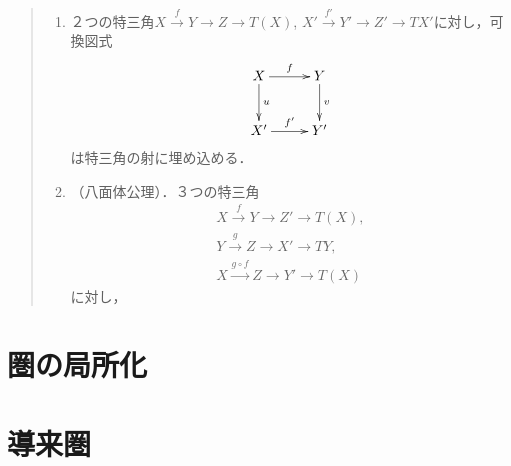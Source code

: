 \begin{Definition}
\begin{description}
\begin{quote}
\begin{enumerate}
                    特三角であることと$Y\overset{g}{\longrightarrow}
                    Z\overset{h}{\longrightarrow} T(X)\overset{-T(f)}{\longrightarrow} TY$が
                    特三角であることは同値である．\label{TR3}
                \item ２つの特三角$X\overset{f}{\to}
                Y\to Z\to T(X)$, $X'\overset{f'}{\to}
                Y'\to Z'\to TX'$に対し，可換図式
                \begin{equation*}
                    \vcenter{\xymatrix
                    @C=26pt@R=26pt
                    {
                    X\ar[r]^-{f}\ar[d]^-{u}
                    &
                    Y\ar[d]^-{v} 
                    \\
                    X'\ar[r]^-{f'}
                    &
                    Y'
                    }}
                \end{equation*}
                は特三角の射に埋め込める．\label{TR4}
                \item（八面体公理）．３つの特三角
                \begin{align*}
                    X\overset{f}{\to}Y\to Z'\to T(X), \\
                    Y\overset{g}{\to}Z\to X'\to TY,\\
                    X\overset{g\circ f}{\longrightarrow}
                    Z\to Y'\to T(X)
                \end{align*}
                に対し， \label{TR5}
            \end{enumerate}    
        \end{quote}
    \end{description}
\end{Definition}

\section{圏の局所化}



\section{導来圏}

